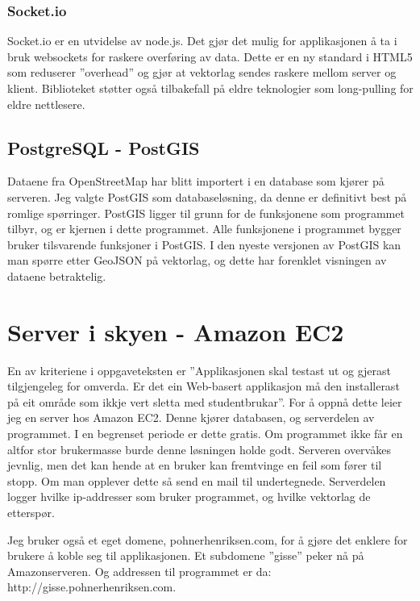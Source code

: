 \documentclass[12pt,twoside,onecolumn]{article}
\begin{document}
		\subsubsection{Socket.io}
		
		Socket.io er en utvidelse av node.js. Det gjør det mulig for applikasjonen å ta i bruk websockets for raskere overføring av data. Dette er en ny standard i HTML5 som reduserer ''overhead'' og gjør at vektorlag sendes raskere mellom server og klient. Biblioteket støtter også tilbakefall på eldre teknologier som long-pulling for eldre nettlesere.
		
	\subsection{PostgreSQL - PostGIS}
		
		Dataene fra OpenStreetMap har blitt importert i en database som kjører på serveren. Jeg valgte PostGIS som databaseløsning, da denne er definitivt best på romlige spørringer. PostGIS ligger til grunn for de funksjonene som programmet tilbyr, og er kjernen i dette programmet. Alle funksjonene i programmet bygger bruker tilsvarende funksjoner i PostGIS. I den nyeste versjonen av PostGIS kan man spørre etter GeoJSON på vektorlag, og dette har forenklet visningen av dataene betraktelig. 
		

\section{Server i skyen - Amazon EC2}

	En av kriteriene i oppgaveteksten er ''Applikasjonen skal testast ut og gjerast tilgjengeleg for omverda. Er det ein Web-basert applikasjon må den installerast på eit område som ikkje vert sletta med studentbrukar''. For å oppnå dette leier jeg en server hos Amazon EC2. Denne kjører databasen, og serverdelen av programmet. I en begrenset periode er dette gratis. Om programmet ikke får en altfor stor brukermasse burde denne løsningen holde godt. Serveren overvåkes jevnlig, men det kan hende at en bruker kan fremtvinge en feil som fører til stopp. Om man opplever dette så send en mail til undertegnede. Serverdelen logger hvilke ip-addresser som bruker programmet, og hvilke vektorlag de etterspør.
	
	Jeg bruker også et eget domene, pohnerhenriksen.com, for å gjøre det enklere for brukere å koble seg til applikasjonen. Et subdomene ''gisse'' peker nå på Amazonserveren. Og addressen til programmet er da: http://gisse.pohnerhenriksen.com.  
\end{document}
